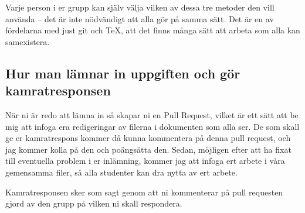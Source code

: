 \documentclass{tufte-handout}
\begin{document}
Varje person i er grupp kan själv välja vilken av dessa tre metoder den vill använda -- det är inte nödvändigt att alla gör på samma sätt. Det är en av fördelarna med just git och TeX, att det finns många sätt att arbeta som alla kan samexistera.

\subsection{Hur man lämnar in uppgiften och gör kamratresponsen}

När ni är redo att lämna in så skapar ni en Pull Request, vilket är ett sätt att be mig att infoga era redigeringar av filerna i dokumenten som alla ser. De som skall ge er kamratrespons kommer då kunna kommentera på denna pull request, och jag kommer kolla på den och poängsätta den. Sedan, möjligen efter att ha fixat till eventuella problem i er inlämning, kommer jag att infoga ert arbete i våra gemensamma filer, så alla studenter kan dra nytta av ert arbete.

Kamratresponsen sker som sagt genom att ni kommenterar på pull requesten gjord av den grupp på vilken ni skall respondera.



\end{document}

